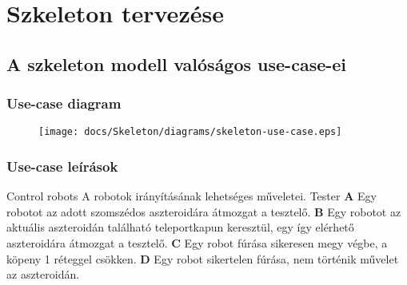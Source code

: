 \documentclass[../../projlab]{subfiles}
\begin{document}
\makeatletter


\makeatother

\chapter{Szkeleton tervezése}


\section{A szkeleton modell valóságos use-case-ei}

\subsection{Use-case diagram}
\begin{figure}[H] 
    \centering 
    \texttt{[image: docs/Skeleton/diagrams/skeleton-use-case.eps]} 
    \caption{} 
\end{figure} 

\subsection{Use-case leírások}

\begin{use-case}
    {Control robots}
    {A robotok irányításának lehetséges műveletei. }
    {Tester} 
    \textbf{A} Egy robotot az adott szomszédos aszteroidára átmozgat a tesztelő.  \newline
    \textbf{B} Egy robotot az aktuális aszteroidán található teleportkapun keresztül, egy így elérhető aszteroidára átmozgat a tesztelő. \newline
    \textbf{C} Egy robot fúrása sikeresen megy végbe, a köpeny 1 réteggel csökken. \newline
    \textbf{D} Egy robot sikertelen fúrása, nem történik művelet az aszteroidán. \newline

\end{use-case}
\end{document}
